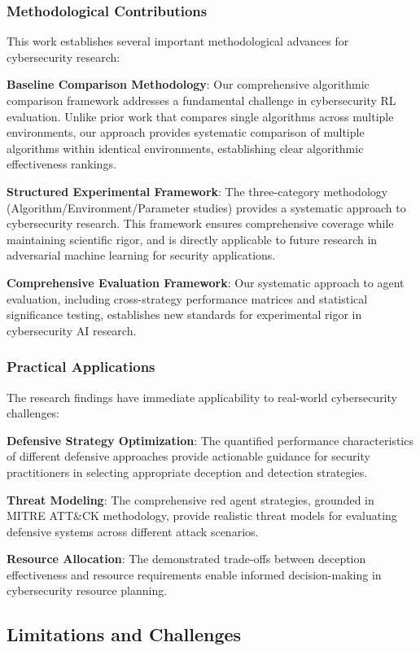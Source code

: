 \documentclass[12pt,twoside]{article}
\theoremstyle{definition}
\theoremstyle{plain}
\begin{document}
\subsubsection{Methodological Contributions}
This work establishes several important methodological advances for cybersecurity research:

\textbf{Baseline Comparison Methodology}: Our comprehensive algorithmic comparison framework addresses a fundamental challenge in cybersecurity RL evaluation. Unlike prior work that compares single algorithms across multiple environments, our approach provides systematic comparison of multiple algorithms within identical environments, establishing clear algorithmic effectiveness rankings.

\textbf{Structured Experimental Framework}: The three-category methodology (Algorithm/Environment/Parameter studies) provides a systematic approach to cybersecurity research. This framework ensures comprehensive coverage while maintaining scientific rigor, and is directly applicable to future research in adversarial machine learning for security applications.

\textbf{Comprehensive Evaluation Framework}: Our systematic approach to agent evaluation, including cross-strategy performance matrices and statistical significance testing, establishes new standards for experimental rigor in cybersecurity AI research.

\subsubsection{Practical Applications}
The research findings have immediate applicability to real-world cybersecurity challenges:

\textbf{Defensive Strategy Optimization}: The quantified performance characteristics of different defensive approaches provide actionable guidance for security practitioners in selecting appropriate deception and detection strategies.

\textbf{Threat Modeling}: The comprehensive red agent strategies, grounded in MITRE ATT\&CK methodology, provide realistic threat models for evaluating defensive systems across different attack scenarios.

\textbf{Resource Allocation}: The demonstrated trade-offs between deception effectiveness and resource requirements enable informed decision-making in cybersecurity resource planning.

\subsection{Limitations and Challenges}
\end{document}
